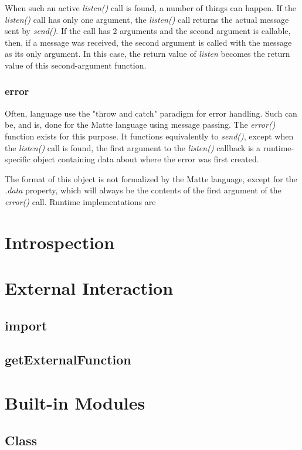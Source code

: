 \documentclass[12pt,letterpaper]{report}
\begin{document}
When such an active \textit{listen()} call is found, a number of things can happen.
If the \textit{listen()} call has only one argument, the \textit{listen()} call returns 
the actual message sent by \textit{send()}. If the call has 2 arguments and the second 
argument is callable, then, if a message was received, the second argument is called 
with the message as its only argument. In this case, the return value of \textit{listen} 
becomes the return value of this second-argument function.



\subsection{error}

Often, language use the "throw and catch" paradigm for error handling. Such can be, and is, done 
for the Matte language using message passing. The \textit{error()} function exists for this purpose. It functions 
equivalently to \textit{send()}, except when the \textit{listen()} call is found, the first argument 
to the \textit{listen()} callback is a runtime-specific object containing data about where the error 
was first created. 

The format of this object is not formalized by the Matte language, except for the 
\textit{.data} property, which will always be the contents of the first argument 
of the \textit{error()} call. Runtime implementations are 

\chapter{Introspection}
\chapter{External Interaction}
\section{import}
\section{getExternalFunction}
\chapter{Built-in Modules}
\section{Class}
\end{document}
